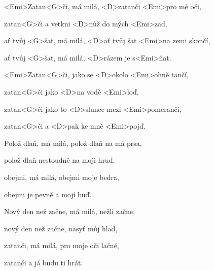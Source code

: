 

\zs
<Emi>Zatan<G>či, má milá, <D>zatanči <Emi>pro mé oči,

zatan<G>či a vetkni <D>nůž do mých <Emi>zad,

ať tvůj <G>šat, má milá, <D>ať tvůj šat <Emi>na zemi skončí,

ať tvůj <G>šat, má milá, <D>rázem je s<Emi>ňat.
\ks

\zr
<Emi>Zatan<G>či, jako se <D>okolo <Emi>ohně tančí,

zatan<G>či jako <D>na vodě <Emi>loď,

zatan<G>či jako to <D>slunce mezi <Emi>pomeranči,

zatan<G>či a <D>pak ke mně <Emi>pojď.
\kr

\zs
Polož dlaň, má milá, polož dlaň na má prsa,

polož dlaň nestoudně na moji hruď,

obejmi, má milá, obejmi moje bedra,

obejmi je pevně a mojí buď.
\ks

\zr \kr

\zs
Nový den než začne, má milá, nežli začne,

nový den než začne, nasyť můj hlad,

zatanči, má milá, pro moje oči lačné,

zatanči a já budu ti hrát.
\ks

\zr \kr

\zr \kr

\kp
